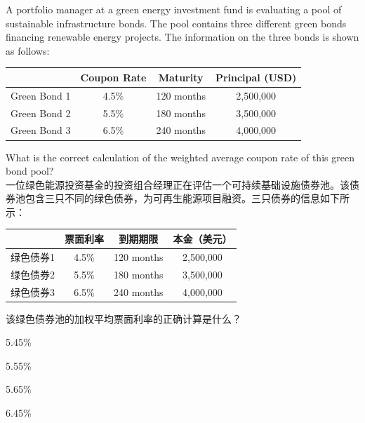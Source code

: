 \documentclass{article}
\newcounter{question} %
\begin{document}
\begin{question}
    A portfolio manager at a green energy investment fund is evaluating a pool of sustainable infrastructure bonds. The pool contains three different green bonds financing renewable energy projects. The information on the three bonds is shown as follows:
    
    \begin{center}
    \begin{tabular}{|c|c|c|c|}
    \hline
     & Coupon Rate & Maturity & Principal (USD) \\
    \hline
    Green Bond 1 & 4.5\% & 120 months & 2,500,000 \\
    \hline
    Green Bond 2 & 5.5\% & 180 months & 3,500,000 \\
    \hline
    Green Bond 3 & 6.5\% & 240 months & 4,000,000 \\
    \hline
    \end{tabular}
    \end{center}
    
    What is the correct calculation of the weighted average coupon rate of this green bond pool?
    \\一位绿色能源投资基金的投资组合经理正在评估一个可持续基础设施债券池。该债券池包含三只不同的绿色债券，为可再生能源项目融资。三只债券的信息如下所示：
    
    \begin{center}
    \begin{tabular}{|c|c|c|c|}
    \hline
     & 票面利率 & 到期期限 & 本金（美元） \\
    \hline
    绿色债券1 & 4.5\% & 120 months & 2,500,000 \\
    \hline
    绿色债券2 & 5.5\% & 180 months & 3,500,000 \\
    \hline
    绿色债券3 & 6.5\% & 240 months & 4,000,000 \\
    \hline
    \end{tabular}
    \end{center}
    
    该绿色债券池的加权平均票面利率的正确计算是什么？
    \end{question}
    
    \begin{choices}
        \item 5.45\%
        \item 5.55\%
        \item 5.65\%
        \item 6.45\%
    \end{choices}
    
\end{document}

